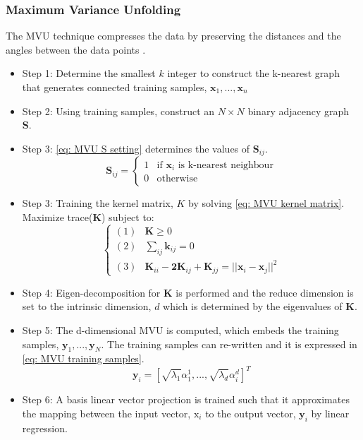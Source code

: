\documentclass[11pt,twocolumn]{witseiepaper}
\begin{document}
	\subsubsection{Maximum Variance Unfolding}
	The MVU technique compresses the data by preserving the distances and the angles between the data points \cite{Shao2009}. 
	\begin{itemize}
		\item Step 1: Determine the smallest $k$ integer to construct the k-nearest graph that generates connected training samples, $\textbf{x}_1, . . . ,\textbf{x}_n$ \\
		\item Step 2: Using training samples, construct an $N \times N$ binary adjacency graph \textbf{S}. \\
		\item Step 3: \eqref{eq: MVU S setting} determines the values of $\textbf{S}_{ij}$.
		\begin{equation}
			\label{eq: MVU S setting}
			\textbf{S}_{ij} = 
			\begin{cases}
				1 & \text{if } \textbf{x}_i \text{ is k-nearest neighbour} \\
				0 & \text{otherwise}
			\end{cases}
		\end{equation}
		\item Step 3: Training the kernel matrix, $K$ by solving \eqref{eq: MVU kernel matrix}.
		\newline
		Maximize trace(\textbf{K}) subject to:
		\begin{equation}
			\label{eq: MVU kernel matrix}
			\begin{cases}
				(1) &\textbf{K} \geq 0 \\
				(2) &\sum_{ij}\textbf{k}_{ij} = 0 \\
				(3) &\textbf{K}_{ii} - \textbf{2K}_{ij} + \textbf{K}_{jj} = ||\textbf{x}_i - \textbf{x}_j||^2
			\end{cases}
		\end{equation}
		\item Step 4: Eigen-decomposition for $\textbf{K}$ is performed and the reduce dimension is set to the intrinsic dimension, $d$ which is determined by the eigenvalues of $\textbf{K}$.\\
		\item Step 5: The d-dimensional MVU is computed, which embeds the training samples, $\textbf{y}_1, . . . , \textbf{y}_N$. The training samples can re-written and it is expressed in \eqref{eq: MVU training samples}.
		\begin{equation}
			\label{eq: MVU training samples}
			\textbf{y}_i = [\sqrt{\lambda_1}\alpha_1^1, . . . ,\sqrt{\lambda_d}\alpha_i^d]^T
		\end{equation}
		\item Step 6: A basis linear vector projection is trained such that it approximates the mapping between the input vector, $\text{x}_i$ to the output vector, $\textbf{y}_i$ by linear regression.
	\end{itemize}
	
\end{document}
